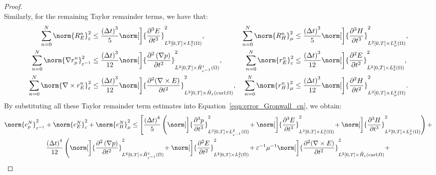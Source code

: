 \documentclass{amsart}
\theoremstyle{thmstyleone}%
\theoremstyle{thmstyletwo}%
\theoremstyle{thmstylethree}%
\DeclareMathOperator{\curl}{curl}
\begin{document}
\begin{proof}
\begin{equation}
\end{equation}
Similarly, for the remaining Taylor remainder terms, we have that:
\begin{alignat}{3}
\sum\limits_{n = 0}^N \norm{R^n_E}^2_{\varepsilon} &\le \dfrac{\left( \Delta t \right)^3}{5} \norm[\bigg]{\dfrac{\partial^3 E}{\partial t^3}}^2_{L^2[0, T] \times L^2_\varepsilon(\Omega)}, & \sum\limits_{n = 0}^N \norm{R^n_H}^2_\mu &\le \dfrac{\left( \Delta t \right)^3}{5} \norm[\bigg]{\dfrac{\partial^3 H}{\partial t^3}}^2_{L^2[0, T] \times L^2_\mu(\Omega)}, \nonumber \\
\sum\limits_{n = 0}^N \norm{\nabla r^n_p}^2_{\varepsilon^{-1}} &\le  \dfrac{\left( \Delta t \right)^3}{12} \norm[\bigg]{\dfrac{\partial^2 \left(\nabla p \right)}{\partial t^2}}^2_{L^2[0, T] \times \mathring{H}^1_{\varepsilon^{-1}}(\Omega)}, & \sum\limits_{n = 0}^N \norm{r^n_E}^2_{\varepsilon} &\le \dfrac{\left( \Delta t \right)^3}{12} \norm[\bigg]{\dfrac{\partial^2 E}{\partial t^2}}^2_{L^2[0, T] \times L^2_\varepsilon(\Omega)}, \label{eqn:Remainder_norms_pEH_cn} \\
\sum\limits_{n = 0}^N \norm{\nabla \times r^n_E}^2_{\varepsilon} &\le \dfrac{\left( \Delta t \right)^3}{12} \norm[\bigg]{\dfrac{\partial^2 (\nabla \times E)}{\partial t^2}}^2_{L^2[0, T] \times \mathring{H}_\varepsilon(\curl; \Omega)}, & \sum\limits_{n = 0}^N \norm{r^n_H}^2_\mu &\le \dfrac{\left( \Delta t \right)^3}{12} \norm[\bigg]{\dfrac{\partial^2 H}{\partial t^2}}^2_{L^2[0, T] \times L^2_\mu(\Omega)} \nonumber.
\end{alignat}
By substituting all these Taylor remainder term estimates into Equation~\eqref{eqn:error_Gronwall_cn}, we obtain:
\begin{multline*}
\norm{e_p^N}^2_{\varepsilon^{-1}} + \norm{e_E^N}^2_{\varepsilon} + \norm{e_H^N}^2_{\mu} \le \Bigg[ \dfrac{\left( \Delta t \right)^4}{5} \left( \norm[\bigg]{\dfrac{\partial^3 p}{\partial t^3}}^2_{L^2[0, T] \times L^2_{\varepsilon^{-1}}(\Omega)} \! + \norm[\bigg]{\dfrac{\partial^3 E}{\partial t^3}}^2_{L^2[0, T] \times L^2_\varepsilon(\Omega)} \! + \norm[\bigg]{\dfrac{\partial^3 H}{\partial t^3}}^2_{L^2[0, T] \times L^2_\mu(\Omega)} \right) + \\
\dfrac{\left( \Delta t \right)^4}{12} \left( \norm[\bigg]{\dfrac{\partial^2 \left( \nabla p \right)}{\partial t^2}}^2_{L^2[0, T] \times \mathring{H}^1_{\varepsilon^{-1}}(\Omega)} \! + \norm[\bigg]{\dfrac{\partial^2 E}{\partial t^2}}^2_{L^2[0, T] \times L^2_\varepsilon(\Omega)} \! + \varepsilon^{-1} \mu^{-1} \norm[\bigg]{\dfrac{\partial^2 (\nabla \times E)}{\partial t^2}}^2_{L^2[0, T] \times \mathring{H}_\varepsilon(\curl; \Omega)} + \right. \\

\end{multline*}
\end{proof}
\end{document}
